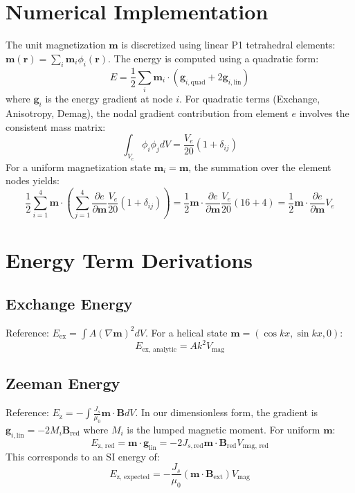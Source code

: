 \documentclass[11pt]{article}
\begin{document}
\section{Numerical Implementation}
The unit magnetization $\mathbf{m}$ is discretized using linear P1 tetrahedral elements: $\mathbf{m}(\mathbf{r}) = \sum_i \mathbf{m}_i \phi_i(\mathbf{r})$. The energy is computed using a quadratic form:
\begin{equation}
    E = \frac{1}{2} \sum_i \mathbf{m}_i \cdot \left( \mathbf{g}_{i,\text{quad}} + 2\mathbf{g}_{i,\text{lin}} \right)
\end{equation}
where $\mathbf{g}_{i}$ is the energy gradient at node $i$. For quadratic terms (Exchange, Anisotropy, Demag), the nodal gradient contribution from element $e$ involves the consistent mass matrix:
\begin{equation}
    \int_{V_e} \phi_i \phi_j dV = \frac{V_e}{20} (1 + \delta_{ij})
\end{equation}
For a uniform magnetization state $\mathbf{m}_i = \mathbf{m}$, the summation over the element nodes yields:
\begin{equation}
    \frac{1}{2} \sum_{i=1}^4 \mathbf{m} \cdot \left( \sum_{j=1}^4 \frac{\partial e}{\partial \mathbf{m}} \frac{V_e}{20} (1 + \delta_{ij}) \right) = \frac{1}{2} \mathbf{m} \cdot \frac{\partial e}{\partial \mathbf{m}} \frac{V_e}{20} (16 + 4) = \frac{1}{2} \mathbf{m} \cdot \frac{\partial e}{\partial \mathbf{m}} V_e
\end{equation}

\section{Energy Term Derivations}

\subsection{Exchange Energy}
Reference: $E_{\text{ex}} = \int A (\nabla \mathbf{m})^2 dV$. For a helical state $\mathbf{m} = (\cos kx, \sin kx, 0)$:
\begin{equation}
    E_{\text{ex, analytic}} = A k^2 V_{\text{mag}}
\end{equation}

\subsection{Zeeman Energy}
Reference: $E_{\text{z}} = -\int \frac{J_s}{\mu_0} \mathbf{m} \cdot \mathbf{B} dV$. In our dimensionless form, the gradient is $\mathbf{g}_{i,\text{lin}} = -2 M_{i} \mathbf{B}_{\text{red}}$ where $M_i$ is the lumped magnetic moment. For uniform $\mathbf{m}$:
\begin{equation}
    E_{\text{z, red}} = \mathbf{m} \cdot \mathbf{g}_{\text{lin}} = -2 J_{s,\text{red}} \mathbf{m} \cdot \mathbf{B}_{\text{red}} V_{\text{mag, red}}
\end{equation}
This corresponds to an SI energy of:
\begin{equation}
    E_{\text{z, expected}} = -\frac{J_s}{\mu_0} (\mathbf{m} \cdot \mathbf{B}_{\text{ext}}) V_{\text{mag}}
\end{equation}
\end{document}
